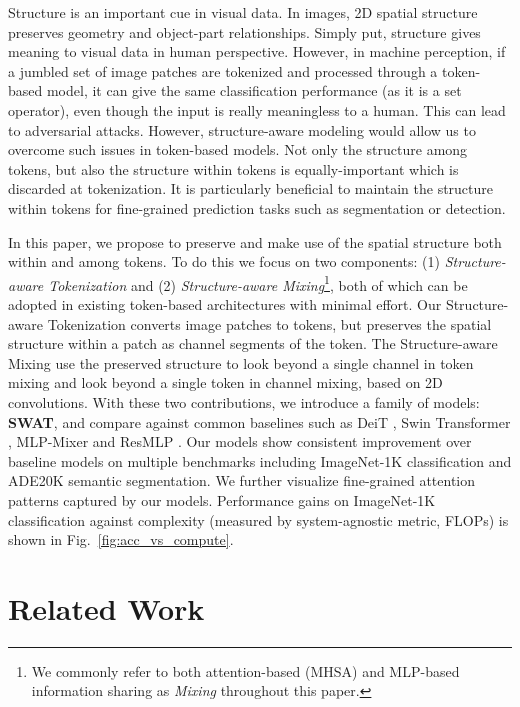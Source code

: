 \documentclass[10pt,twocolumn,letterpaper]{article}
\newcommand{\fref}[1]{Fig.~\ref{#1}}
\begin{document}
Structure is an important cue in visual data. In images, 2D spatial structure preserves geometry and object-part relationships.
Simply put, structure gives meaning to visual data in human perspective. However, in machine perception, if a jumbled set of image patches are tokenized and processed through a token-based model, it can give the same classification performance (as it is a set operator), even though the input is really meaningless to a human. This can lead to adversarial attacks. However, structure-aware modeling would allow us to overcome such issues in token-based models. Not only the structure among tokens, but also the structure within tokens is equally-important which is discarded at tokenization. It is particularly beneficial to maintain the structure within tokens for fine-grained prediction tasks such as segmentation or detection.

In this paper, we propose to preserve and make use of the spatial structure both within and among tokens. To do this we focus on two components: (1) \textit{Structure-aware Tokenization} and (2) \textit{Structure-aware Mixing}\footnote{We commonly refer to both attention-based (MHSA) and MLP-based information sharing as \textit{Mixing} throughout this paper.}, both of which can be adopted in existing token-based architectures with minimal effort. Our Structure-aware Tokenization converts image patches to tokens, but preserves the spatial structure within a patch as channel segments of the token. The Structure-aware Mixing use the preserved structure to look beyond a single channel in token mixing and look beyond a single token in channel mixing, based on 2D convolutions. With these two contributions, we introduce a family of models: \textbf{SWAT}, and compare against common baselines such as DeiT \cite{touvron2021deit}, Swin Transformer \cite{liu2021swin}, MLP-Mixer \cite{tolstikhin2021mixer} and ResMLP \cite{touvron2021resmlp}. Our models show consistent improvement over baseline models on multiple benchmarks including ImageNet-1K \cite{deng2009imagenet} classification and ADE20K \cite{zhou2019ade20k} semantic segmentation. We further visualize fine-grained attention patterns captured by our models. Performance gains on ImageNet-1K classification against complexity (measured by system-agnostic metric, FLOPs) is shown in \fref{fig:acc_vs_compute}.


\section{Related Work}
\label{sec:related}
\end{document}
